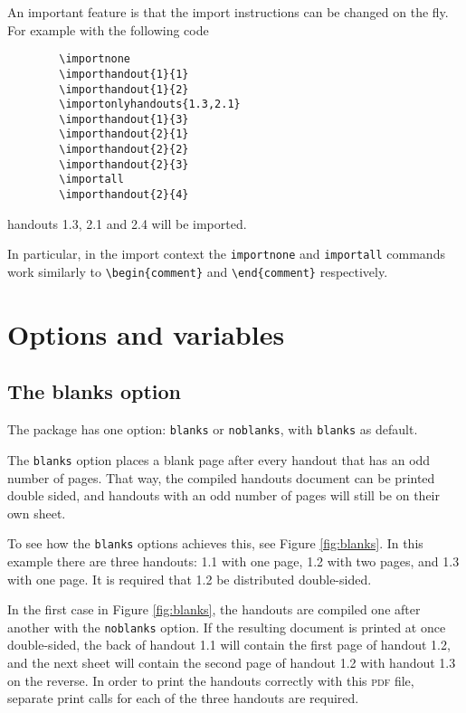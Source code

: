 \documentclass[10pt,oneside,letterpaper]{article}
\newcommand{\pdf}{\textsc{pdf} }
\begin{document}
An important feature is that the import instructions can be changed on the fly.
For example with the following code
\begin{verbatim}
    	\importnone
    	\importhandout{1}{1}
    	\importhandout{1}{2}
    	\importonlyhandouts{1.3,2.1}
    	\importhandout{1}{3}
    	\importhandout{2}{1}
    	\importhandout{2}{2}
    	\importhandout{2}{3}
    	\importall
    	\importhandout{2}{4}
\end{verbatim}
handouts 1.3, 2.1 and 2.4 will be imported.

In particular, in the import context the \texttt{importnone} and \texttt{importall} commands work similarly to 
	\verb$\begin{comment}$ and \verb$\end{comment}$ respectively.


\section{Options and variables}


\subsection{The blanks option}

\label{sec:options}


The package has one option: \texttt{blanks} or \texttt{noblanks}, with \texttt{blanks} as default.

The \texttt{blanks} option places a blank page after every handout that has an odd number of pages. 
That way, the compiled handouts document can be printed double sided, and handouts with an odd number of pages will still be on their own sheet.

To see how the \texttt{blanks} options achieves this, see Figure \ref{fig:blanks}.
In this example there are three handouts: 1.1 with one page, 1.2 with two pages, and 1.3 with one page.
It is required that 1.2 be distributed double-sided.


In the first case in Figure \ref{fig:blanks}, the handouts are compiled one after another with the \texttt{noblanks} option.
If the resulting document is printed at once double-sided,
the back of handout 1.1 will contain the first page of handout 1.2, and the next sheet will contain the second page of handout 1.2 with handout 1.3 on the reverse.
In order to print the handouts correctly with this \pdf file, separate print calls for each of the three handouts are required.
\end{document}
